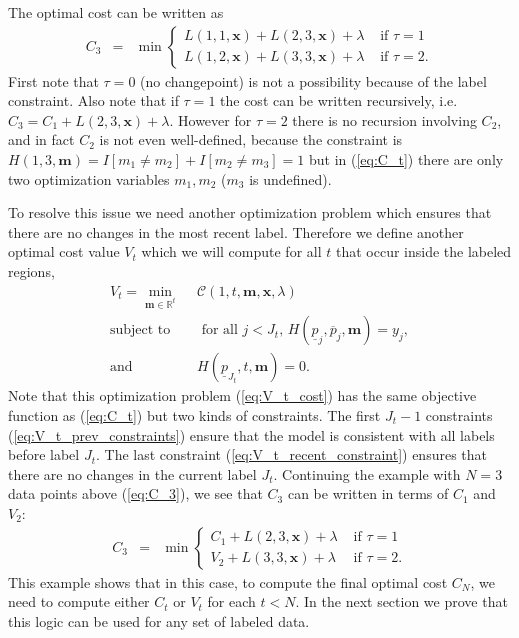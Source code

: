 \documentclass[12pt]{article}
\begin{document}
The optimal cost can be written as
\begin{eqnarray}
  C_3
  &=& \min \begin{cases}
  L(1, 1, \mathbf x)+L(2, 3, \mathbf x) + \lambda 
  & \text{ if } \tau=1\\  
  L(1, 2, \mathbf x)+L(3, 3, \mathbf x) + \lambda
  & \text{ if } \tau=2.
  \end{cases}
  \label{eq:C_3}
\end{eqnarray}
First note that $\tau=0$ (no changepoint) is not a possibility because of the label constraint. 
Also note that if $\tau=1$ the cost can be written recursively, i.e. $C_3 = C_1 + L(2, 3, \mathbf x) + \lambda$. 
However for $\tau=2$ there is no recursion involving $C_2$, and in fact $C_2$ is not even well-defined, because the constraint is $H(1,3,\mathbf m)=I[m_1\neq m_2]+I[m_2\neq m_3]=1$ but in (\ref{eq:C_t}) there are only two optimization variables $m_1,m_2$ ($m_3$ is undefined).

To resolve this issue we need another optimization problem which ensures that there are no changes in the most recent label. 
Therefore we define another optimal cost value $V_t$ which we will compute for all $t$ that occur inside the labeled regions,
\begin{align}
 V_t = \min_{
  \mathbf m\in\mathbb R^{t}
  } &\ \ 
  \label{eq:V_t_cost}
\mathcal C(1, t, \mathbf m, \mathbf x, \lambda)
\\
    \text{subject to} 
& \ \ \text{ for all } j < J_t,\, 
H(\underline p_j, \overline p_j, \mathbf m)=y_j,
\label{eq:V_t_prev_constraints}\\
\text{and} 
& \ \ 
H(\underline p_{J_t}, t, \mathbf m)=0.
\label{eq:V_t_recent_constraint}
\end{align}
Note that this optimization problem (\ref{eq:V_t_cost}) has the same objective function as (\ref{eq:C_t}) but two kinds of constraints. The first $J_t-1$ constraints (\ref{eq:V_t_prev_constraints}) ensure that the model is consistent with all labels before label $J_t$. The last constraint (\ref{eq:V_t_recent_constraint}) ensures that there are no changes in the current label $J_t$. 
Continuing the example with $N=3$ data points above (\ref{eq:C_3}), we see that $C_3$ can be written in terms of $C_1$ and $V_2$:
\begin{eqnarray}
  C_3
  &=& \min \begin{cases}
  C_1 +L(2, 3, \mathbf x) + \lambda 
  & \text{ if } \tau=1\\  
  V_2 +L(3, 3, \mathbf x) + \lambda
  & \text{ if } \tau=2.
  \end{cases}
  \label{eq:C_3_recursive}
\end{eqnarray}
This example shows that in this case, to compute the final optimal cost $C_N$, we need to compute either $C_t$ or $V_t$ for each $t<N$.
In the next section we prove that this logic can be used for any set of labeled data.
\end{document}
